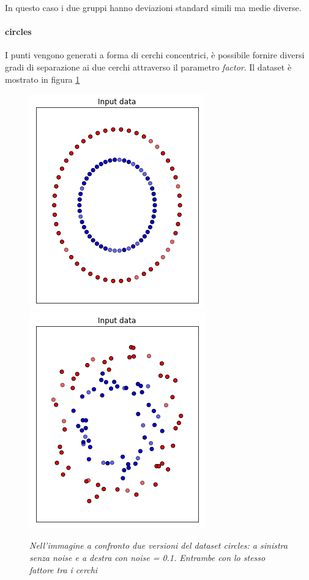 \documentclass[12pt,a4paper]{report}
\begin{document}
In questo caso i due gruppi hanno deviazioni standard simili ma medie diverse.

\paragraph{circles} I punti vengono generati a forma di cerchi concentrici, è possibile fornire diversi gradi di separazione ai due cerchi attraverso il parametro \textit{factor}. Il dataset è mostrato in figura \ref{circles}

\begin{figure}[H]
 \centering
 \includegraphics[scale = 0.5]{images/circles_nonoise}
 \includegraphics[scale = 0.5]{images/circles_noise}
 \caption{\textit{Nell'immagine a confronto due versioni del dataset circles: a sinistra senza noise e a destra con noise = 0.1. Entrambe con lo stesso fattore tra i cerchi}}
 \label{circles}
\end{figure}
\end{document}
